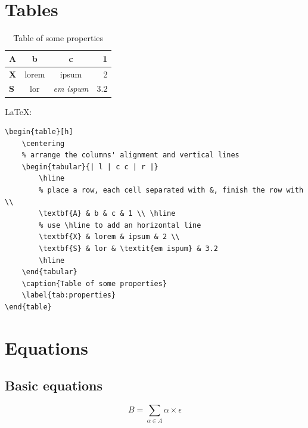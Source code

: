 \documentclass[12pt,nonacm,acmlarge,titlepage,screen]{acmart}
\begin{document}
\section*{Tables}

\begin{table}[h]
    \centering
    \begin{tabular}{| l | c c | r |}
        \hline
        \textbf{A} & b & c & 1 \\ \hline
        \textbf{X} & lorem & ipsum & 2 \\
        \textbf{S} & lor & \textit{em ispum} & 3.2 \\ \hline
    \end{tabular}
    \caption{Table of some properties}
    \label{tab:properties}
\end{table}

\noindent\LaTeX:
\begin{Verbatim}[frame=single]
\begin{table}[h]
    \centering
    % arrange the columns' alignment and vertical lines
    \begin{tabular}{| l | c c | r |}
        \hline
        % place a row, each cell separated with &, finish the row with \\
        \textbf{A} & b & c & 1 \\ \hline
        % use \hline to add an horizontal line
        \textbf{X} & lorem & ipsum & 2 \\
        \textbf{S} & lor & \textit{em ispum} & 3.2 
        \hline
    \end{tabular}
    \caption{Table of some properties}
    \label{tab:properties}
\end{table}
\end{Verbatim}

\section*{Equations}

\subsection*{Basic equations}

\begin{equation} \label{eq:my_equation}
    B = \sum_{\alpha \in A} \alpha \times \epsilon
\end{equation}
\end{document}
